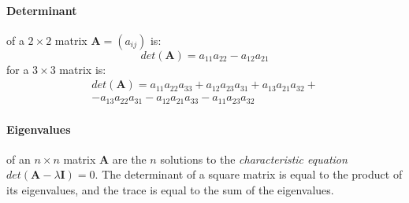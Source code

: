 \documentclass[a4paper,twocolumn]{article}
\begin{document}
\paragraph{Determinant} of a $2 \times 2$ matrix $\mathbf{A} = (a_{ij})$ is:
\begin{equation}
	det(\mathbf{A}) = a_{11} a_{22} - a_{12} a_{21}
\end{equation}
for a $3 \times 3$ matrix is:
\begin{multline*}
	det(\mathbf{A}) = a_{11} a_{22} a_{33} + a_{12} a_{23} a_{31} +
	a_{13} a_{21} a_{32} + \\ - a_{13} a_{22} a_{31} - a_{12} a_{21}
	a_{33} - a_{11} a_{23} a_{32}
\end{multline*}
\paragraph{Eigenvalues} of an $n \times n$ matrix $\mathbf{A}$ are the $n$
solutions to the \textit{characteristic equation} $det(\mathbf{A} - \lambda
\mathbf{I}) = 0$. The determinant of a square matrix is equal to the product
of its eigenvalues, and the trace is equal to the sum of the eigenvalues.
\end{document}
